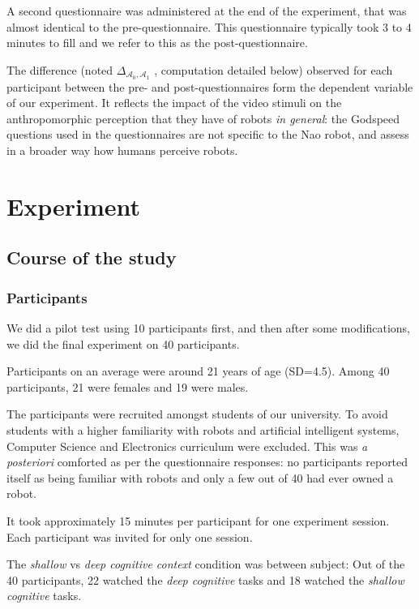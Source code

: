 \documentclass[a4,twocolumn,10pt]{article}
\newcommand{\deltaant}{{ $\Delta_{\mathcal{A}_0,\mathcal{A}_1}$ }}
\begin{document}
A second questionnaire was administered at the end of the experiment, that was
almost identical to the pre-questionnaire.  This questionnaire typically took 3
to 4 minutes to fill and we refer to this as the post-questionnaire.

The difference (noted \deltaant, computation detailed below) observed for
each participant between the pre- and post-questionnaires form the dependent
variable of our experiment. It reflects the impact of the video stimuli on the
anthropomorphic perception that they have of robots \emph{in general}: the
Godspeed questions used in the questionnaires are not specific to the Nao robot,
and assess in a broader way how humans perceive robots.

\section{Experiment}

\subsection{Course of the study}

\subsubsection{Participants}

We did a pilot test using 10 participants first, and then after some
modifications, we did the final experiment on 40 participants.

Participants on an average were around 21 years of age (SD=4.5). Among 40
participants, 21 were females and 19 were males.

The participants were recruited amongst students of our university. To avoid students
with a higher familiarity with robots and artificial intelligent systems,
Computer Science and Electronics curriculum were excluded. This was \textit{a
posteriori} comforted as per the questionnaire responses: no
participants
reported itself as being familiar with robots and only a few out of 40 had ever owned a robot.

It took
approximately 15 minutes per participant for one experiment session.  Each
participant was invited for only one session. 

The \emph{shallow} vs \emph{deep cognitive context} condition was between
subject: Out of the 40 participants, 22 watched the \emph{deep cognitive}
tasks and 18 watched the \emph{shallow cognitive} tasks.
\end{document}
